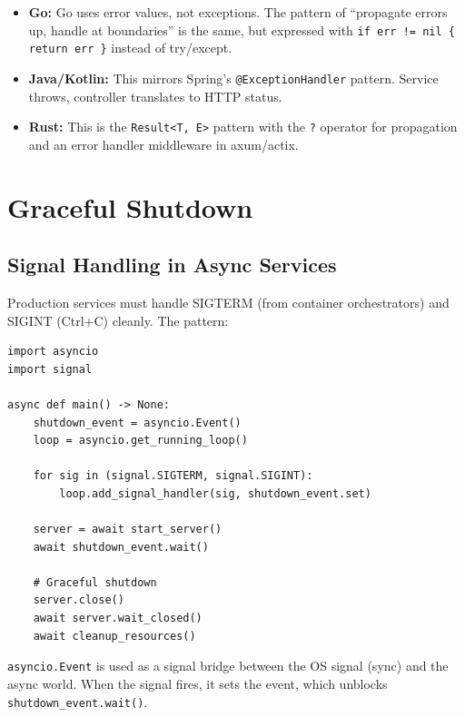 \documentclass[11pt,a4paper,oneside]{book}
\newcommand{\py}[1]{\texttt{\color{pyblue}#1}}
\newcommand{\rustcode}[1]{\texttt{\color{BrickRed}#1}}
\begin{document}
\begin{analogybox}
\begin{itemize}
    \item \textcolor{goblue}{\textbf{Go:}} Go uses error values, not exceptions. The pattern of
          ``propagate errors up, handle at boundaries'' is the same, but expressed with
          \texttt{if err != nil \{ return err \}} instead of try/except.
    \item \textcolor{javaorange}{\textbf{Java/Kotlin:}} This mirrors Spring's
          \texttt{@ExceptionHandler} pattern. Service throws, controller translates to HTTP status.
    \item \textcolor{BrickRed}{\textbf{Rust:}} This is the \rustcode{Result<T, E>} pattern with
          the \texttt{?} operator for propagation and an error handler middleware in axum/actix.
\end{itemize}
\end{analogybox}

\chapter{Graceful Shutdown}

\section{Signal Handling in Async Services}

Production services must handle SIGTERM (from container orchestrators) and SIGINT (Ctrl+C)
cleanly. The pattern:

\begin{lstlisting}[style=python]
import asyncio
import signal

async def main() -> None:
    shutdown_event = asyncio.Event()
    loop = asyncio.get_running_loop()

    for sig in (signal.SIGTERM, signal.SIGINT):
        loop.add_signal_handler(sig, shutdown_event.set)

    server = await start_server()
    await shutdown_event.wait()

    # Graceful shutdown
    server.close()
    await server.wait_closed()
    await cleanup_resources()
\end{lstlisting}

\begin{infobox}
\py{asyncio.Event} is used as a signal bridge between the OS signal (sync) and the async world.
When the signal fires, it sets the event, which unblocks \py{shutdown\_event.wait()}.
\end{infobox}
\end{document}
